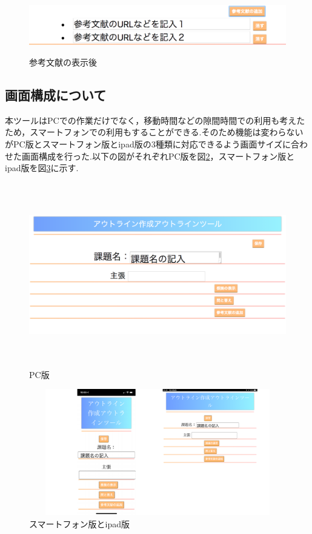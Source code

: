 \documentclass[a4j,12pt]{jarticle}
\begin{document}
\begin{figure}[h]
\begin{center}
 \includegraphics[clip,width=150mm,height=25mm]{07sankou.png}
\end{center}
 \caption{参考文献の表示後}
 \label{fig:o}
\end{figure}

\newpage
\subsection{画面構成について}
本ツールはPCでの作業だけでなく，移動時間などの隙間時間での利用も考えたため，スマートフォンでの利用もすることができる.そのため機能は変わらないがPC版とスマートフォン版とipad版の3種類に対応できるよう画面サイズに合わせた画面構成を行った.以下の図がそれぞれPC版を図\ref{fig:p}，スマートフォン版とipad版を図\ref{fig:q}に示す.
\begin{figure}[h]
\begin{center}
 \includegraphics[clip,width=150mm,height=80mm]{08gamen.png}
\end{center}
 \caption{PC版}
 \label{fig:p}
\end{figure}

\begin{figure}[h]
\begin{center}
 \includegraphics[clip,width=120mm,height=55mm]{pp00.pdf}
\end{center}
 \caption{スマートフォン版とipad版}
 \label{fig:q}
\end{figure}
\end{document}
